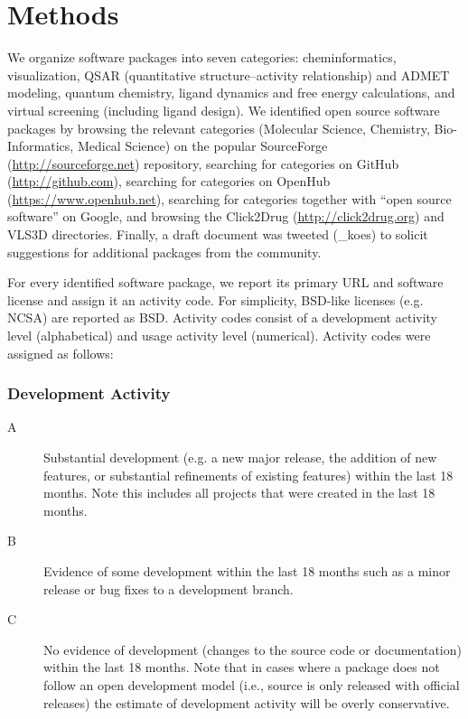 \section{Methods}

We organize software packages into seven categories: cheminformatics, visualization, QSAR (quantitative structure–activity relationship) and ADMET modeling, quantum chemistry, ligand dynamics and free energy calculations, and virtual screening (including ligand design).
We identified open source software packages by browsing the relevant categories (Molecular Science, Chemistry, Bio-Informatics, Medical Science) on the popular SourceForge (\url{http://sourceforge.net}) repository, searching for categories on GitHub (\url{http://github.com}), searching for categories on OpenHub (\url{https://www.openhub.net}), searching for categories together with ``open source software'' on Google, and browsing the Click2Drug (\url{http://click2drug.org}) and VLS3D \cite{Villoutreix_2013} directories.  Finally, a draft document was tweeted (\@david_koes) to solicit suggestions for additional packages from the community.

For every identified software package, we report its primary URL and software license and assign it an activity code. For simplicity, BSD-like licenses (e.g. NCSA) are reported as BSD. Activity codes consist of a development activity level (alphabetical) and usage activity level (numerical). Activity codes were assigned as follows:
\subsubsection*{Development Activity}
\begin{description}
  \item[A] Substantial development (e.g. a new major release, the addition of new features, or substantial refinements of existing features) within the last 18 months. Note this includes all projects that were created in the last 18 months.
  \item[B] Evidence of some development within the last 18 months such as a minor release or bug fixes to a development branch.
  \item[C] No evidence of development (changes to the source code or documentation) within the last 18 months. Note that in cases where a package does not follow an open development model (i.e., source is only released with official releases) the estimate of development activity will be overly conservative.
\end{description}

